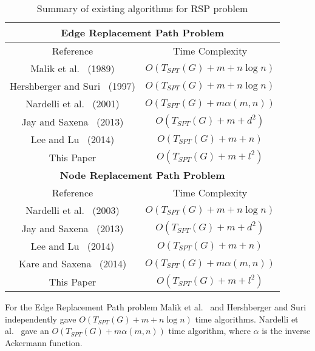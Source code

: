 \documentclass[11pt,a4paper]{llncs}
\begin{document}
\begin{table}[H]
\centering
\begin{tabular}{|c|c|}
\hline
  \multicolumn{2}{|c|}{\textbf{Edge Replacement Path Problem}}  \\
  \hline
  Reference & Time Complexity  \\
  \hline
  Malik et al.~\cite{kmve} (1989) & $O(T_{SPT}(G)+ m + n \log n)$  \\
  \hline
  Hershberger and Suri~\cite{vickreyprice} (1997) & $O(T_{SPT}(G)+ m + n \log n)$  \\
  \hline
  Nardelli et al.~\cite{fastermve} (2001) & $O(T_{SPT}(G)+ m \alpha(m, n))$  \\
  \hline
  Jay and Saxena~\cite{jay} (2013) & $O(T_{SPT}(G)+ m + d^2)$  \\
  \hline
  Lee and Lu~\cite{linearrsp} (2014) & $O(T_{SPT}(G)+ m + n)$  \\
  \hline
  This Paper & $O(T_{SPT}(G)+ m + l^2)$  \\
  \hline
  \multicolumn{2}{|c|}{\textbf{Node Replacement Path Problem}}  \\
  \hline
  Reference & Time Complexity  \\
  \hline
  Nardelli et al.~\cite{mostvn} (2003) & $O(T_{SPT}(G)+ m + n \log n)$  \\
  \hline
  Jay and Saxena~\cite{jay} (2013) & $O(T_{SPT}(G)+ m + d^2)$  \\
  \hline
  Lee and Lu~\cite{linearrsp} (2014) & $O(T_{SPT}(G)+ m + n)$  \\
  \hline
  Kare and Saxena~\cite{asksax} (2014) & $O(T_{SPT}(G)+ m \alpha(m, n))$  \\
  \hline
  This Paper & $O(T_{SPT}(G)+ m + l^2)$  \\
  \hline
  \end{tabular}
\label{table1}
\caption{Summary of existing algorithms \protect\footnotemark for RSP problem}
\end{table}


For the Edge Replacement Path problem Malik et al.~\cite{kmve} and Hershberger
and Suri~\cite{vickreyprice} independently gave $O(T_{SPT}(G)+ m + n \log n)$
time algorithms. Nardelli et al.~\cite{fastermve} gave an $O(T_{SPT}(G)+ m \alpha(m, n))$
time algorithm, where $\alpha$ is the inverse Ackermann function.
\end{document}
